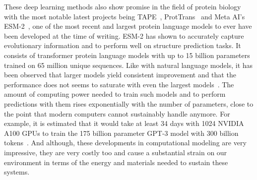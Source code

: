 These deep learning methods also show promise in the field of protein biology with the most notable latest projects being TAPE~\cite{tape}, ProtTrans~\cite{prottrans} and Meta AI's ESM-2~\cite{esm2}, one of the most recent and largest protein language models to ever have been developed at the time of writing. ESM-2 has shown to accurately capture evolutionary information and to perform well on structure prediction tasks. It consists of transformer protein language models with up to 15 billion parameters trained on 65 million unique sequences. Like with natural language models, it has been observed that larger models yield consistent improvement and that the performance does not seems to saturate with even the largest models~\cite{Ofer}. The amount of computing power needed to train such models and to perform predictions with them rises exponentially with the number of parameters, close to the point that modern computers cannot sustainably handle anymore. For example, it is estimated that it would take at least 34 days with 1024 NVIDIA A100 GPUs to train the 175 billion parameter GPT-3 model with 300 billion tokens~\cite{gptrain}. And although, these developments in computational modeling are very impressive, they are very costly too and cause a substantial strain on our environment in terms of the energy and materials needed to sustain these systems.